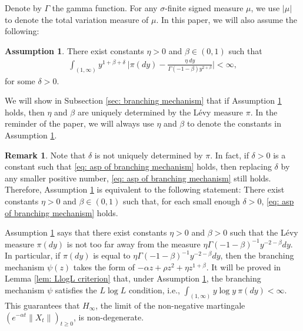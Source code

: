 \documentclass[12pt,a4paper]{amsart}
\theoremstyle{plain}
\theoremstyle{definition}
\newtheorem{rem}[thm]{Remark}
\newtheorem{asp}{Assumption}
\numberwithin{equation}{section}
\begin{document}
Denote by $\Gamma$ the gamma function.
For any $\sigma$-finite signed measure $\mu$, we use $|\mu|$ to denote the total variation measure of $\mu$.
In this paper, we will also assume the following:
\begin{asp}
  \label{asp: branching mechanism}
  There exist constants $\eta > 0$ and $\beta \in (0,1)$ such that
  \begin{align}
    \label{eq: asp of branching mechanism}
    \int_{(1,\infty)}y^{1+\beta +\delta}~\Big|\pi(dy)-\frac{\eta~dy}{\Gamma(-1-\beta)y^{2+\beta}}\Big| <\infty,
  \end{align}
	for some $\delta > 0$.
\end{asp}
We will show in Subsection \ref{sec: branching mechanism} that if Assumption \ref{asp: branching mechanism} holds, then $\eta$ and $\beta$ are uniquely determined by the L\'evy measure $\pi$.
In the reminder of the paper, we will always use $\eta$ and $\beta$ to denote the constants in Assumption  \ref{asp: branching mechanism}.

\begin{rem}
  \label{rem: small enough delta}
	Note that $\delta$ is not uniquely determined by $\pi$.
	In fact, if $\delta>0$ is a constant such that \eqref{eq: asp of branching mechanism} holds, then replacing $\delta$ by any smaller positive number, \eqref{eq: asp of branching mechanism} still holds.
	Therefore, Assumption \ref{asp: branching mechanism} is equivalent to the following statement: 
	There exist constants $\eta > 0$ and $\beta \in (0,1)$ such that, for each small enough $\delta>0$, \eqref{eq: asp of branching mechanism} holds.
\end{rem}

Assumption \ref{asp: branching mechanism} says that there exist constants $\eta>0$ and $\beta > 0$ such that the L\'evy measure $\pi(dy)$ is not too far away from the measure $\eta \Gamma(-1-\beta)^{-1}y^{-2-\beta} dy$.
In particular, if $\pi(dy)$ is equal to $\eta \Gamma(-1-\beta)^{-1}y^{-2-\beta} dy$, then the branching mechanism $\psi(z)$ takes the form of $-\alpha z + \rho z^2 + \eta z^{1+\beta}$.
It will be proved in Lemma \ref{lem: LlogL criterion} that, under Assumption \ref{asp: branching mechanism}, the branching mechanism $\psi$ satisfies the $L \log L$ condition, i.e., $ \int_{(1,\infty)} y\log y~\pi(dy) < \infty. $
This guarantees that $H_\infty$, the limit of the non-negative martingale $(e^{-\alpha t} \|X_t\|)_{t\geq 0}$, is non-degenerate.
\end{document}
